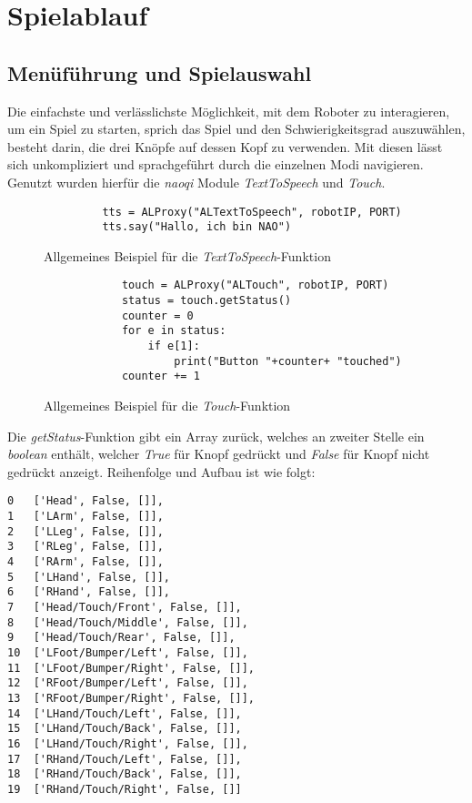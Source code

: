 \section{Spielablauf}

\subsection{Menüführung und Spielauswahl}

Die einfachste und verlässlichste Möglichkeit, mit dem Roboter zu interagieren, um ein Spiel zu starten, sprich das Spiel und den Schwierigkeitsgrad auszuwählen, besteht darin, die drei Knöpfe auf dessen Kopf zu verwenden. Mit diesen lässt sich unkompliziert und sprachgeführt durch die einzelnen Modi navigieren. Genutzt wurden hierfür die \textit{naoqi} Module \textit{TextToSpeech} und \textit{Touch}\cite{aldebaran_robotics}.

\begin{figure*}[h]
    \begin{verbatim}
         tts = ALProxy("ALTextToSpeech", robotIP, PORT)
         tts.say("Hallo, ich bin NAO")
    \end{verbatim}
    \caption{Allgemeines Beispiel für die \textit{TextToSpeech}-Funktion}
    \label{alg:textToSpeech_example}
\end{figure*}

\begin{figure*}[h]
    \begin{verbatim}
            touch = ALProxy("ALTouch", robotIP, PORT)
            status = touch.getStatus()
            counter = 0
            for e in status:
                if e[1]:
                    print("Button "+counter+ "touched")
            counter += 1
    \end{verbatim}
    \caption{Allgemeines Beispiel für die \textit{Touch}-Funktion}
    \label{alg:touch_example}
\end{figure*}

Die \textit{getStatus}-Funktion gibt ein Array zurück, welches an zweiter Stelle ein \textit{boolean} enthält, welcher \textit{True} für Knopf gedrückt und \textit{False} für Knopf nicht gedrückt anzeigt. Reihenfolge und Aufbau ist wie folgt:

\begin{verbatim}
0   ['Head', False, []], 
1   ['LArm', False, []], 
2   ['LLeg', False, []], 
3   ['RLeg', False, []], 
4   ['RArm', False, []], 
5   ['LHand', False, []], 
6   ['RHand', False, []], 
7   ['Head/Touch/Front', False, []], 
8   ['Head/Touch/Middle', False, []], 
9   ['Head/Touch/Rear', False, []], 
10  ['LFoot/Bumper/Left', False, []], 
11  ['LFoot/Bumper/Right', False, []], 
12	['RFoot/Bumper/Left', False, []], 
13  ['RFoot/Bumper/Right', False, []], 
14  ['LHand/Touch/Left', False, []], 
15  ['LHand/Touch/Back', False, []], 
16  ['LHand/Touch/Right', False, []], 
17	['RHand/Touch/Left', False, []], 
18  ['RHand/Touch/Back', False, []], 
19  ['RHand/Touch/Right', False, []]
\end{verbatim}

